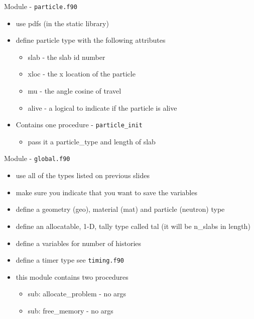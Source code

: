\documentclass{beamer}
\begin{document}
\begin{frame}{Module - \texttt{particle.f90}}

  \begin{itemize}
    \item use pdfs (in the static library)
    \vfill\item define particle type with the following attributes
    \begin{itemize}
      \item slab - the slab id number
      \vfill\item  xloc - the x location of the particle
      \vfill\item mu - the angle cosine of travel
      \vfill\item alive - a logical to indicate if the particle is alive
    \end{itemize}
    \vfill \item Contains one procedure - \texttt{particle\_init}
    \begin{itemize}
      \item pass it a particle\_type and length of slab
    \end{itemize}
  \end{itemize}

\end{frame}
\begin{frame}{Module - \texttt{global.f90}}

  \begin{itemize}
    \item use all of the types listed on previous slides
    \vfill\item make sure you indicate that you want to save the variables
    \vfill\item define a geometry (geo), material (mat) and particle (neutron) type
    \vfill\item define an allocatable, 1-D, tally type called tal (it will be n\_slabs in length)
    \vfill\item define a variables for number of histories
    \vfill\item define a timer type see \texttt{timing.f90}
    \vfill\item this module contains two procedures
    \begin{itemize}
      \item sub: allocate\_problem - no args
      \item sub: free\_memory - no args
    \end{itemize}
  \end{itemize}
\end{frame}
\end{document}
